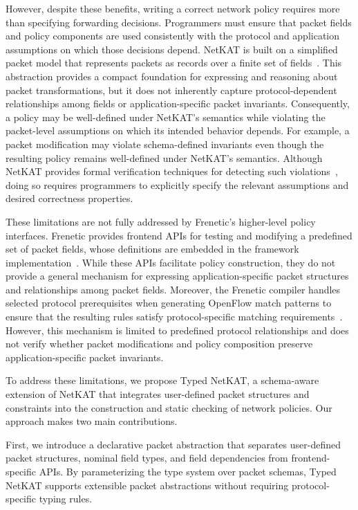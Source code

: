 
However, despite these benefits, writing a correct network policy requires more than specifying forwarding decisions. Programmers must ensure that packet fields and policy components are used consistently with the protocol and application assumptions on which those decisions depend. 
NetKAT is built on a simplified packet model that represents packets as records over a finite set of fields~\cite{anderson2014netkat}. This abstraction provides a compact foundation for expressing and reasoning about packet transformations, but it does not inherently capture protocol-dependent relationships among fields or application-specific packet invariants. Consequently, a policy may be well-defined under NetKAT's semantics while violating the packet-level assumptions on which its intended behavior depends.
For example, a packet modification may violate schema-defined invariants even though the resulting policy remains well-defined under NetKAT's semantics.
Although NetKAT provides formal verification techniques for detecting such violations~\cite{anderson2014netkat,foster2015coalgebraic}, doing so requires programmers to explicitly specify the relevant assumptions and desired correctness properties.

These limitations are not fully addressed by Frenetic's higher-level policy interfaces. Frenetic provides frontend APIs for testing and modifying a predefined set of packet fields, whose definitions are embedded in the framework implementation~\cite{freneticsoftware}. While these APIs facilitate policy construction, they do not provide a general mechanism for expressing application-specific packet structures and relationships among packet fields.
Moreover, the Frenetic compiler handles selected protocol prerequisites when generating OpenFlow match patterns to ensure that the resulting rules satisfy protocol-specific matching requirements~\cite{freneticsoftware}. However, this mechanism is limited to predefined protocol relationships and does not verify whether packet modifications and policy composition preserve application-specific packet invariants.


To address these limitations, we propose Typed NetKAT, a schema-aware extension of NetKAT that integrates
user-defined packet structures and constraints into the construction and static checking of network policies. Our approach makes two main contributions.

First, we introduce a declarative packet abstraction that separates user-defined packet structures, nominal field types, and field dependencies from frontend-specific APIs. By parameterizing the type system over packet schemas, Typed NetKAT supports extensible packet abstractions without requiring protocol-specific typing rules.

